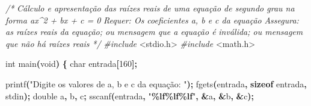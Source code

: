 \documentclass[
  11pt,
  a4paper,
]{scrbook}
\newenvironment{Shaded}{\begin{snugshade}}{\end{snugshade}}
\newcommand{\CommentTok}[1]{\textcolor[rgb]{0.56,0.35,0.01}{\textit{#1}}}
\newcommand{\DataTypeTok}[1]{\textcolor[rgb]{0.13,0.29,0.53}{#1}}
\newcommand{\DecValTok}[1]{\textcolor[rgb]{0.00,0.00,0.81}{#1}}
\newcommand{\ImportTok}[1]{#1}
\newcommand{\KeywordTok}[1]{\textcolor[rgb]{0.13,0.29,0.53}{\textbf{#1}}}
\newcommand{\NormalTok}[1]{#1}
\newcommand{\OperatorTok}[1]{\textcolor[rgb]{0.81,0.36,0.00}{\textbf{#1}}}
\newcommand{\PreprocessorTok}[1]{\textcolor[rgb]{0.56,0.35,0.01}{\textit{#1}}}
\newcommand{\SpecialCharTok}[1]{\textcolor[rgb]{0.81,0.36,0.00}{\textbf{#1}}}
\newcommand{\StringTok}[1]{\textcolor[rgb]{0.31,0.60,0.02}{#1}}
\begin{document}
\begin{Shaded}
\begin{Highlighting}[]
\CommentTok{/*}
\CommentTok{Cálculo e apresentação das raízes reais de uma equação de segundo grau na}
\CommentTok{    forma ax\^{}2 + bx + c = 0}
\CommentTok{Requer: Os coeficientes a, b e c da equação}
\CommentTok{Assegura: as raízes reais da equação; ou mensagem que a equação é}
\CommentTok{    inválida; ou mensagem que não há raízes reais}
\CommentTok{*/}
\PreprocessorTok{\#include }\ImportTok{\textless{}stdio.h\textgreater{}}
\PreprocessorTok{\#include }\ImportTok{\textless{}math.h\textgreater{}}

\DataTypeTok{int}\NormalTok{ main}\OperatorTok{(}\DataTypeTok{void}\OperatorTok{)} \OperatorTok{\{}
    \DataTypeTok{char}\NormalTok{ entrada}\OperatorTok{[}\DecValTok{160}\OperatorTok{];}

\NormalTok{    printf}\OperatorTok{(}\StringTok{"Digite os valores de a, b e c da equação: "}\OperatorTok{);}
\NormalTok{    fgets}\OperatorTok{(}\NormalTok{entrada}\OperatorTok{,} \KeywordTok{sizeof}\NormalTok{ entrada}\OperatorTok{,}\NormalTok{ stdin}\OperatorTok{);}
    \DataTypeTok{double}\NormalTok{ a}\OperatorTok{,}\NormalTok{ b}\OperatorTok{,}\NormalTok{ c}\OperatorTok{;}
\NormalTok{    sscanf}\OperatorTok{(}\NormalTok{entrada}\OperatorTok{,} \StringTok{"}\SpecialCharTok{\%lf\%lf\%lf}\StringTok{"}\OperatorTok{,} \OperatorTok{\&}\NormalTok{a}\OperatorTok{,} \OperatorTok{\&}\NormalTok{b}\OperatorTok{,} \OperatorTok{\&}\NormalTok{c}\OperatorTok{);}


\end{Highlighting}
\end{Shaded}
\end{document}
